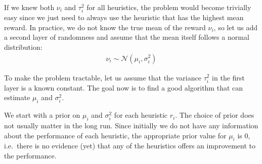 \documentclass[fleqn,10pt,lineno]{wlpeerj} %
\newcommand{\Normal}{\mathcal{N}}
\begin{document}
If we knew both $\nu_i$ and $\tau_i^2$ for all heuristics, the problem would
become trivially easy since we just need to always use the heuristic that has
the highest mean reward. In practice, we do not know the true mean of the
reward $\nu_i$, so let us add a second layer of randomness and assume that
the mean itself follows a normal distribution:
	\begin{align}
        \nu_i \sim \Normal(\mu_i, \sigma_i^2)
    \end{align}

To make the problem tractable, let us assume that the variance $\tau_i^2$ in
the first layer is a known constant. The goal now is to find a good algorithm
that can estimate $\mu_i$ and $\sigma_i^2$.

We start with a prior on $\mu_i$ and $\sigma_i^2$ for each heuristic $r_i$. The
choice of prior does not usually matter in the long run. Since initially we do
not have any information about the performance of each heuristic, the
appropriate prior value for $\mu_i$ is $0$, i.e.\ there is no evidence (yet)
that any of the heuristics offers an improvement to the performance.
\end{document}

